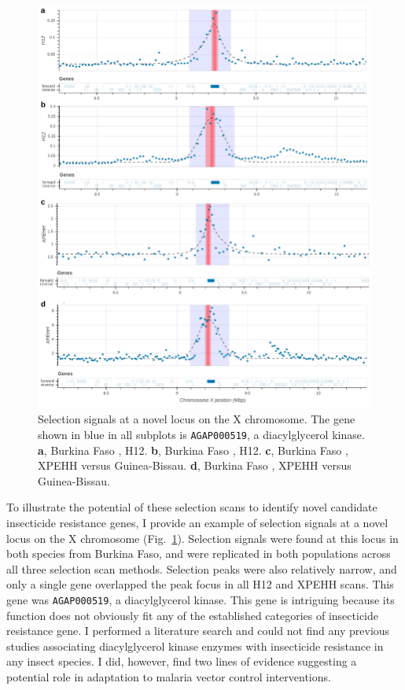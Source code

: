 \documentclass[a4paper,11pt,abstracton,hidelinks]{scrartcl}
\begin{document}
\begin{figure}[t!]
\centering
\includegraphics[width=1\textwidth,center]{artwork/chapter5/dgk.pdf}
\caption{Selection signals at a novel locus on the X chromosome.
%
The gene shown in blue in all subplots is \texttt{AGAP000519}, a diacylglycerol kinase.
%
\textbf{a}, Burkina Faso \acol, H12.
%
\textbf{b}, Burkina Faso \agam, H12.
%
\textbf{c}, Burkina Faso \acol, XPEHH versus Guinea-Bissau.
%
\textbf{d}, Burkina Faso \agam, XPEHH versus Guinea-Bissau.
}
\label{fig:dgk}
\end{figure}


To illustrate the potential of these selection scans to identify novel candidate insecticide resistance genes, I provide an example of selection signals at a novel locus on the X chromosome (Fig.~\ref{fig:dgk}).
%
Selection signals were found at this locus in both species from Burkina Faso, and were replicated in both populations across all three selection scan methods.
%
Selection peaks were also relatively narrow, and only a single gene overlapped the peak focus in all H12 and XPEHH scans.
%
This gene was \texttt{AGAP000519}, a diacylglycerol kinase.
%
This gene is intriguing because its function does not obviously fit any of the established categories of insecticide resistance gene.
%
I performed a literature search and could not find any previous studies associating diacylglycerol kinase enzymes with insecticide resistance in any insect species.
%
I did, however, find two lines of evidence suggesting a potential role in adaptation to malaria vector control interventions.
\end{document}
